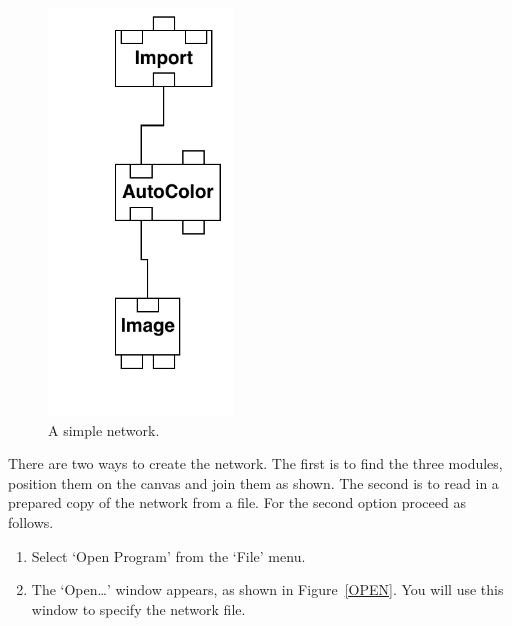 \documentclass[twoside,11pt]{starlink}
\begin{document}
\begin{enumerate}
\begin{figure}[htbp]
  \begin{center}
  \leavevmode
  \includegraphics[width=139pt]{sc2_simple}
  \end{center}

  \caption[A simple network.]{A simple network. \label{SIMPLE} }

  \end{figure}

   There are two ways to create the network. The first is to find the
   three modules, position them on the canvas and join them as shown.
   The second is to read in a prepared copy of the network from a file.
   For the second option proceed as follows.

  \begin{enumerate}

    \item Select `Open Program' from the `File' menu.

    \item The `Open\ldots' window appears, as shown in
     Figure~\ref{OPEN}. You will use this window to specify the network
     file.

    \newpage
    \begin{figure}[htbp]


\end{figure}
\end{enumerate}
\end{enumerate}
\end{document}

